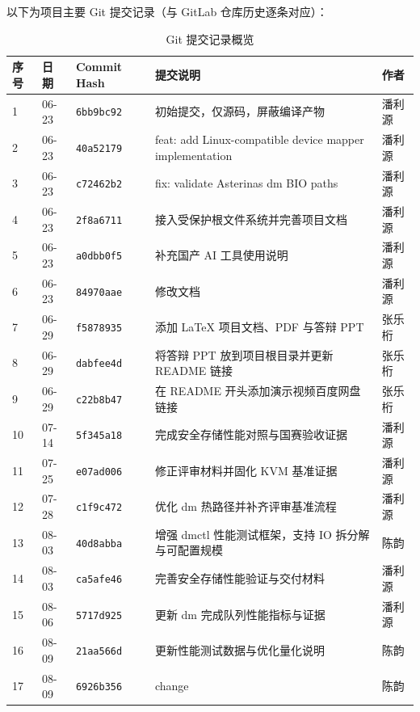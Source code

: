 以下为项目主要 Git 提交记录（与 GitLab 仓库历史逐条对应）：

\begin{table}[H]
    \centering
    \small
    \caption{Git 提交记录概览}
    \label{tab:git_commits}
    \begin{tabular}{p{}p{}p{}p{}p{}}
        \toprule
        \textbf{序号} & \textbf{日期} & \textbf{Commit Hash} & \textbf{提交说明} & \textbf{作者} \\
        \midrule
        1 & 06-23 & \texttt{6bb9bc92} & 初始提交，仅源码，屏蔽编译产物 & 潘利源 \\
        2 & 06-23 & \texttt{40a52179} & feat: add Linux-compatible device mapper implementation & 潘利源 \\
        3 & 06-23 & \texttt{c72462b2} & fix: validate Asterinas dm BIO paths & 潘利源 \\
        4 & 06-23 & \texttt{2f8a6711} & 接入受保护根文件系统并完善项目文档 & 潘利源 \\
        5 & 06-23 & \texttt{a0dbb0f5} & 补充国产 AI 工具使用说明 & 潘利源 \\
        6 & 06-23 & \texttt{84970aae} & 修改文档 & 潘利源 \\
        7 & 06-29 & \texttt{f5878935} & 添加 LaTeX 项目文档、PDF 与答辩 PPT & 张乐桁 \\
        8 & 06-29 & \texttt{dabfee4d} & 将答辩 PPT 放到项目根目录并更新 README 链接 & 张乐桁 \\
        9 & 06-29 & \texttt{c22b8b47} & 在 README 开头添加演示视频百度网盘链接 & 张乐桁 \\
        10 & 07-14 & \texttt{5f345a18} & 完成安全存储性能对照与国赛验收证据 & 潘利源 \\
        11 & 07-25 & \texttt{e07ad006} & 修正评审材料并固化 KVM 基准证据 & 潘利源 \\
        12 & 07-28 & \texttt{c1f9c472} & 优化 dm 热路径并补齐评审基准流程 & 潘利源 \\
        13 & 08-03 & \texttt{40d8abba} & 增强 dmctl 性能测试框架，支持 IO 拆分解与可配置规模 & 陈韵 \\
        14 & 08-03 & \texttt{ca5afe46} & 完善安全存储性能验证与交付材料 & 潘利源 \\
        15 & 08-06 & \texttt{5717d925} & 更新 dm 完成队列性能指标与证据 & 潘利源 \\
        16 & 08-09 & \texttt{21aa566d} & 更新性能测试数据与优化量化说明 & 陈韵 \\
        17 & 08-09 & \texttt{6926b356} & change & 陈韵 \\

\end{tabular}
\end{table}
